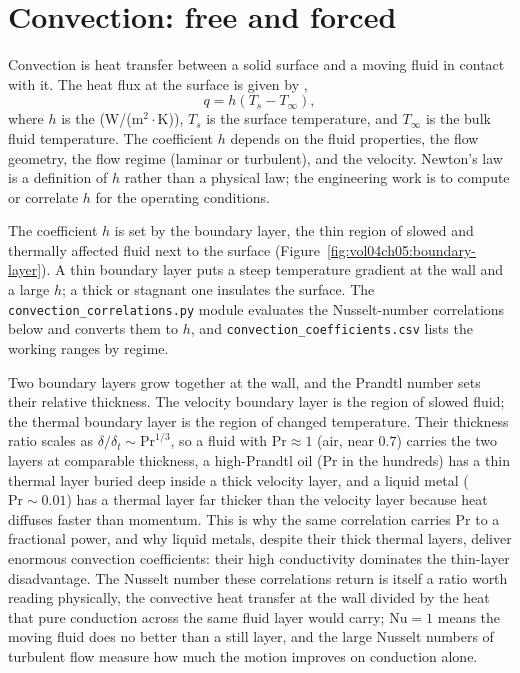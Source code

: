\section{Convection: free and forced}

Convection is heat transfer between a solid surface and a moving
fluid in contact with it. The heat flux at the surface is given by
,
\[
q = h (T_s - T_\infty),
\]
where $h$ is the 
(W/(m$^2\cdot$K)), $T_s$ is the surface temperature, and $T_\infty$
is the bulk fluid temperature. The coefficient $h$ depends on the
fluid properties, the flow geometry, the flow regime (laminar or
turbulent), and the velocity. Newton's law is a definition of $h$
rather than a physical law; the engineering work is to compute or
correlate $h$ for the operating conditions.



The coefficient $h$ is set by the boundary layer, the thin region of
slowed and thermally affected fluid next to the surface
(Figure~\ref{fig:vol04ch05:boundary-layer}). A thin boundary layer
puts a steep temperature gradient at the wall and a large $h$; a thick
or stagnant one insulates the surface. The
\texttt{convection\_correlations.py} module evaluates the Nusselt-number
correlations below and converts them to $h$, and
\texttt{convection\_coefficients.csv} lists the working ranges by
regime.

Two boundary layers grow together at the wall, and the Prandtl number
sets their relative thickness. The velocity boundary layer is the region
of slowed fluid; the thermal boundary layer is the region of changed
temperature. Their thickness ratio scales as $\delta/\delta_t \sim
\text{Pr}^{1/3}$, so a fluid with $\text{Pr} \approx 1$ (air, near
$0.7$) carries the two layers at comparable thickness, a high-Prandtl
oil ($\text{Pr}$ in the hundreds) has a thin thermal layer buried deep
inside a thick velocity layer, and a liquid metal ($\text{Pr} \sim
0.01$) has a thermal layer far thicker than the velocity layer because
heat diffuses faster than momentum. This is why the same correlation
carries $\text{Pr}$ to a fractional power, and why liquid metals,
despite their thick thermal layers, deliver enormous convection
coefficients: their high conductivity dominates the thin-layer
disadvantage. The Nusselt number these correlations return is itself a
ratio worth reading physically, the convective heat transfer at the wall
divided by the heat that pure conduction across the same fluid layer
would carry; $\text{Nu} = 1$ means the moving fluid does no better than
a still layer, and the large Nusselt numbers of turbulent flow measure
how much the motion improves on conduction alone.

